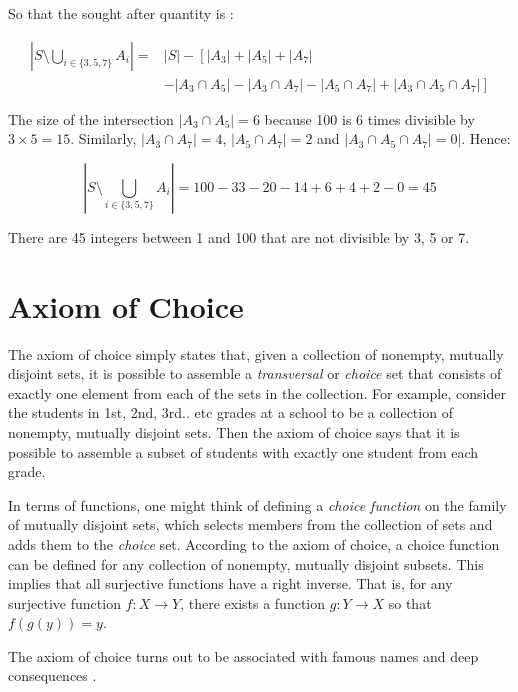 So that the sought after quantity is :

\begin{equation}
\begin{array}{rl}
\left|S \setminus \bigcup_{i\in\{3,5,7\}} A_i\right| =& |S| - \left[ |A_3| + |A_5| + |A_7| \right.\\
& \left. - |A_3 \cap A_5| - |A_3 \cap A_7| - |A_5\cap A_7| + |A_3\cap A_5\cap A_7|\right]
\end{array}
\end{equation}

The size of the intersection $|A_3\cap A_5| = 6$ because 100 is 6 times divisible by $3\times 5 = 15$. Similarly, $|A_3 \cap A_7| =  4$, $|A_5 \cap A_7| =  2$ and $|A_3\cap A_5 \cap A_7| =  0|$. Hence:

\begin{equation}
\left|S \setminus \bigcup_{i\in\{3,5,7\}} A_i\right| = 100 - 33 - 20 - 14 + 6 + 4 + 2 - 0 = 45
\end{equation}

There are 45 integers between 1 and 100 that are not divisible by 3, 5 or 7.


\section{Axiom of Choice}
The axiom of choice simply states that, given a collection of nonempty, mutually disjoint sets, it is possible to assemble a \textit{transversal} or \textit{choice} set that consists of exactly one element from each of the sets in the collection. For example, consider the students in 1st, 2nd, 3rd.. etc grades at a school to be a collection of nonempty, mutually disjoint sets. Then the axiom of choice says that it is possible to assemble a subset of students with exactly one student from each grade. 


In terms of functions, one might think of defining a \textit{choice function} on the family of mutually disjoint sets, which selects members from the collection of sets and adds them to the \textit{choice} set. According to the axiom of choice, a choice function can be defined for any collection of nonempty, mutually disjoint subsets. This implies that all surjective functions have a right inverse. That is, for any surjective function $f:X\rightarrow Y$, there exists a function $g:Y\rightarrow X$ so that $f(g(y)) = y$.   

The axiom of choice turns out to be associated with famous names and deep consequences \cite{stanfordaxiomofchoice}.

